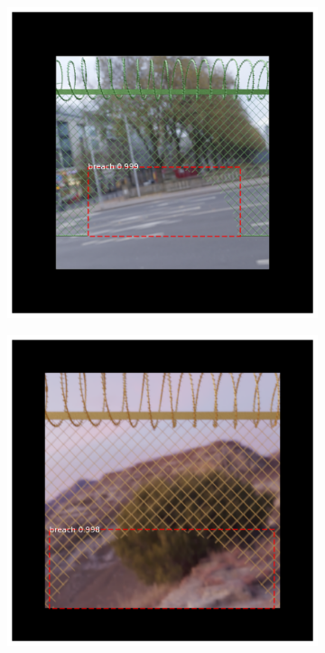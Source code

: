 \documentclass[../Head/Main.tex]{subfiles}
\begin{document}
\begin{figure}[H]
\begin{subfigure}{.24\textwidth}
        \caption{}
    \end{subfigure}
    \hfill
    \begin{subfigure}{.24\textwidth}
        \centering
        \includegraphics[width=\textwidth]{../Figures/rcnn_results/found_breaches/good_performance/16.png}
        \caption{}
    \end{subfigure}
    \hfill
    \begin{subfigure}{.24\textwidth}
        \centering
        \includegraphics[width=\textwidth]{../Figures/rcnn_results/found_breaches/good_performance/13.png}

\end{subfigure}
\end{figure}
\end{document}
